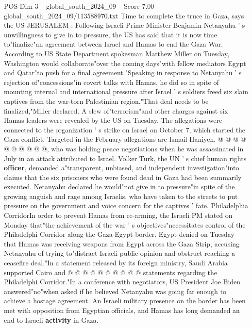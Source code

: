 \begin{textsample}{POS Dim 3 – global\_south\_2024\_09 – Score 7.00 – global\_south\_2024\_09/113588970.txt}  \label{ex:f3_pos_328}
Time to complete the truce in Gaza, says the US JERUSALEM : Following Israeli Prime Minister Benjamin Netanyahu ' s unwillingness to give in to pressure, the US has said that it is now time to"finalize"an agreement between Israel and Hamas to end the Gaza War.
According to US State Department spokesman Matthew Miller on Tuesday, Washington would collaborate"over the coming days"with fellow mediators Egypt and Qatar"to push for a final agreement."Speaking in response to Netanyahu ' s rejection of"concessions"in covert talks with Hamas, he did so in spite of mounting internal and international pressure after Israel ' s soldiers freed six slain captives from the war-torn Palestinian region."That deal needs to be finalized,"Miller declared.
A slew of"terrorism"and other charges against six Hamas leaders were revealed by the US on Tuesday.
The allegations were connected to the organization ' s strike on Israel on October 7, which started the Gaza conflict.
Targeted in the February allegations are Ismail Haniyeh, @ @ @ @ @ @ @ @ @ @, who was holding peace negotiations when he was assassinated in July in an attack attributed to Israel.
Volker Turk, the UN ' s chief human rights \textbf{officer}, demanded a"transparent, unbiased, and independent investigation"into claims that the six prisoners who were found dead in Gaza had been summarily executed.
Netanyahu declared he would"not give in to pressure"in spite of the growing anguish and rage among Israelis, who have taken to the streets to put pressure on the government and voice concern for the captives ' fate.
Philadelphia CorridorIn order to prevent Hamas from re-arming, the Israeli PM stated on Monday that"the achievement of the war ' s objectives"necessitates control of the Philadelphi Corridor along the Gaza-Egypt border.
Egypt denied on Tuesday that Hamas was receiving weapons from Egypt across the Gaza Strip, accusing Netanyahu of trying to"distract Israeli public opinion and obstruct reaching a ceasefire deal."In a statement released by its foreign ministry, Saudi Arabia supported Cairo and @ @ @ @ @ @ @ @ @ @ statements regarding the Philadelphi Corridor."In a conference with negotiators, US President Joe Biden answered"no"when asked if he believed Netanyahu was going far enough to achieve a hostage agreement.
An Israeli military presence on the border has been met with opposition from Egyptian officials, and Hamas has long demanded an end to Israeli \textbf{activity} in Gaza.

\end{textsample}
